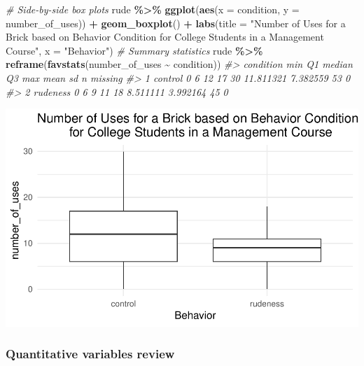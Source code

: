 \documentclass[
]{report}
\newenvironment{Shaded}{\begin{snugshade}}{\end{snugshade}}
\newcommand{\AttributeTok}[1]{\textcolor[rgb]{0.13,0.29,0.53}{#1}}
\newcommand{\CommentTok}[1]{\textcolor[rgb]{0.56,0.35,0.01}{\textit{#1}}}
\newcommand{\FunctionTok}[1]{\textcolor[rgb]{0.13,0.29,0.53}{\textbf{#1}}}
\newcommand{\NormalTok}[1]{#1}
\newcommand{\SpecialCharTok}[1]{\textcolor[rgb]{0.81,0.36,0.00}{\textbf{#1}}}
\newcommand{\StringTok}[1]{\textcolor[rgb]{0.31,0.60,0.02}{#1}}
\begin{document}
\begin{Shaded}
\begin{Highlighting}[]
\CommentTok{\# Side{-}by{-}side box plots}
\NormalTok{rude }\SpecialCharTok{\%\textgreater{}\%}
\FunctionTok{ggplot}\NormalTok{(}\FunctionTok{aes}\NormalTok{(}\AttributeTok{x =}\NormalTok{ condition, }\AttributeTok{y =}\NormalTok{ number\_of\_uses)) }\SpecialCharTok{+}
    \FunctionTok{geom\_boxplot}\NormalTok{() }\SpecialCharTok{+} 
    \FunctionTok{labs}\NormalTok{(}\AttributeTok{title =} \StringTok{"Number of Uses for a Brick based on Behavior Condition}
\StringTok{         for College Students in a Management Course"}\NormalTok{,}
         \AttributeTok{x =} \StringTok{"Behavior"}\NormalTok{) }
\CommentTok{\# Summary statistics}
\NormalTok{rude }\SpecialCharTok{\%\textgreater{}\%} 
     \FunctionTok{reframe}\NormalTok{(}\FunctionTok{favstats}\NormalTok{(number\_of\_uses }\SpecialCharTok{\textasciitilde{}}\NormalTok{ condition))}
\CommentTok{\#\textgreater{}   condition min Q1 median Q3 max      mean       sd  n missing}
\CommentTok{\#\textgreater{} 1   control   0  6     12 17  30 11.811321 7.382559 53       0}
\CommentTok{\#\textgreater{} 2  rudeness   0  6      9 11  18  8.511111 3.992164 45       0}
\end{Highlighting}
\end{Shaded}

\begin{center}\includegraphics[width=0.6\linewidth]{12-A24-inference-1ofeach-simulation_files/figure-latex/unnamed-chunk-2-1} \end{center}

\subsubsection*{Quantitative variables review}\label{quantitative-variables-review}
\end{document}

